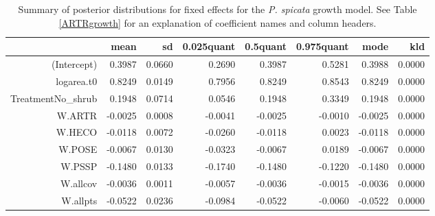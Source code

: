 \documentclass[11pt]{article}
\begin{document}
\begin{table}[ht]
\centering
\caption{Summary of posterior distributions for fixed effects for the \textit{P. spicata} growth model. See Table \ref{ARTRgrowth} for an explanation of coefficient names
and column headers.} 
\label{PSSPgrowth}
\begin{tabular}{rrrrrrrr}
  \hline
 & mean & sd & 0.025quant & 0.5quant & 0.975quant & mode & kld \\ 
  \hline
(Intercept) & 0.3987 & 0.0660 & 0.2690 & 0.3987 & 0.5281 & 0.3988 & 0.0000 \\ 
  logarea.t0 & 0.8249 & 0.0149 & 0.7956 & 0.8249 & 0.8543 & 0.8249 & 0.0000 \\ 
  TreatmentNo\_shrub & 0.1948 & 0.0714 & 0.0546 & 0.1948 & 0.3349 & 0.1948 & 0.0000 \\ 
  W.ARTR & -0.0025 & 0.0008 & -0.0041 & -0.0025 & -0.0010 & -0.0025 & 0.0000 \\ 
  W.HECO & -0.0118 & 0.0072 & -0.0260 & -0.0118 & 0.0023 & -0.0118 & 0.0000 \\ 
  W.POSE & -0.0067 & 0.0130 & -0.0323 & -0.0067 & 0.0189 & -0.0067 & 0.0000 \\ 
  W.PSSP & -0.1480 & 0.0133 & -0.1740 & -0.1480 & -0.1220 & -0.1480 & 0.0000 \\ 
  W.allcov & -0.0036 & 0.0011 & -0.0057 & -0.0036 & -0.0015 & -0.0036 & 0.0000 \\ 
  W.allpts & -0.0522 & 0.0236 & -0.0984 & -0.0522 & -0.0060 & -0.0522 & 0.0000 \\ 
   \hline
\end{tabular}
\end{table}
\end{document}
